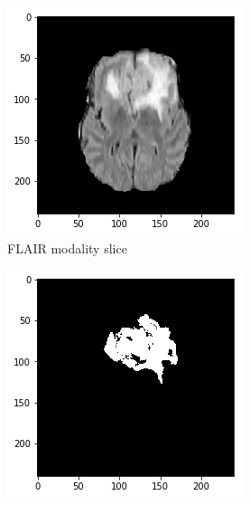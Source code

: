 \begin{figure}[H]
    \centering
    \begin{subfigure}[t]{.4\textwidth}
        \centering
        \includegraphics[width=\linewidth]{chapters/06_hdm/c_Brats18_2013_17_1_L1/56.png}
        \caption{FLAIR modality slice}
    \end{subfigure}\hspace{1cm}%
    \begin{subfigure}[t]{.4\textwidth}
        \centering
        \includegraphics[width=\linewidth]{chapters/06_hdm/c_Brats18_2013_17_1_L1/55.png}

\end{subfigure}
\end{figure}
